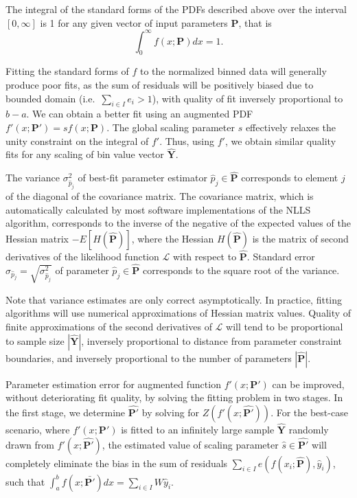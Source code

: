 \documentclass{article}
\begin{document}
The integral of the standard forms of the PDFs described above over the interval $[0, \infty]$ is 1 for any given vector of input parameters $\bm{P}$, that is
\begin{equation}
\int_0^\infty f(x; \bm{P}) dx =  1.
\end{equation}

Fitting the standard forms of $f$ to the normalized binned data will generally produce poor fits, as the sum of residuals will be positively biased due to bounded domain (i.e.~$\sum_{i \in I} e_i>1$), with quality of fit inversely proportional to $b - a$.
We can obtain a better fit using an augmented PDF $f'(x; \bm{P'}) = sf(x; \bm{P})$.
The global scaling parameter $s$ effectively relaxes the unity constraint on the integral of $f'$.
Thus, using $f'$, we obtain similar quality fits for any scaling of bin value vector $\bm{\hat{Y}}$.

The variance $\sigma^2_{\hat{p}_j}$ of best-fit parameter estimator $\hat{p}_j \in \bm{\hat{P}}$ corresponds to element $j$ of the diagonal of the covariance matrix.
The covariance matrix, which is automatically calculated by most software implementations of the NLLS algorithm, corresponds to the inverse of the  negative of the expected values of the Hessian matrix $-E[H(\bm{\hat{P}})]$, where the Hessian $H(\bm{\hat{P}})$ is the matrix of second derivatives of the likelihood function $\mathcal{L}$ with respect to $\bm{\hat{P}}$.
Standard error $\sigma_{\hat{p}_j} = \sqrt{\sigma^2_{\hat{p}_j}}$ of parameter $\hat{p}_{j} \in \bm{\hat{P}}$ corresponds to the square root of the variance.

Note that variance estimates are only correct asymptotically.
In practice, fitting algorithms will use numerical approximations of Hessian matrix values.
Quality of finite approximations of the second derivatives of $\mathcal{L}$ will tend to be proportional to sample size $|\bm{\hat{Y}}|$, inversely proportional to distance from parameter constraint boundaries, and inversely proportional to the number of parameters $|\bm{\hat{P}}|$.

Parameter estimation error for augmented function  $f'(x; \bm{P'})$ can be improved, without deteriorating fit quality, by solving the fitting problem in two stages.
In the first stage, we determine $\bm{\hat{P'}}$ by solving for $Z(f'(x; \bm{\hat{P'}}))$.
For the best-case scenario, where $f'(x; \bm{P'})$ is fitted to an infinitely large sample $\bm{\hat{Y}}$ randomly drawn from $f'(x; \bm{\hat{P'}})$, the estimated value of scaling parameter $\hat{s} \in \bm{\hat{P'}}$ will completely eliminate the bias in the sum of residuals $\sum_{i \in I} e(f(x_i; \bm{\hat{P}}), \hat{y}_i)$, such that $\int_a^b f(x; \bm{\bar{P'}}) dx = \sum_{i \in I} W\hat{y}_i$.
\end{document}
